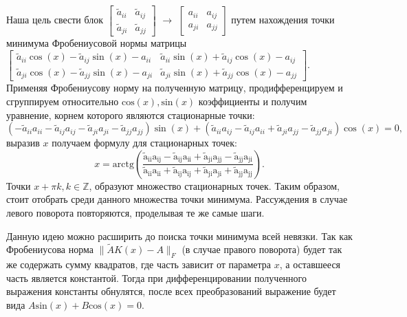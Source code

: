 Наша цель свести блок $\begin{bmatrix}
    \tilde{a}_{ii}&\tilde{a}_{ij}\\
    \tilde{a}_{ji}&\tilde{a}_{jj}
\end{bmatrix}$ $\to $
$\begin{bmatrix}
    a_{ii}&a_{ij}\\
    a_{ji}&a_{jj}
\end{bmatrix}$ путем нахождения точки минимума Фробениусовой нормы матрицы $\left[\begin{matrix}\tilde{a}_{ii} \cos{\left(x \right)} - \tilde{a}_{ij} \sin{\left(x \right)} - a_{ii} & \tilde{a}_{ii} \sin{\left(x \right)} + \tilde{a}_{ij} \cos{\left(x \right)} - a_{ij}\\ \tilde{a}_{ji} \cos{\left(x \right)} - \tilde{a}_{jj} \sin{\left(x \right)} - a_{ji} & \tilde{a}_{ji} \sin{\left(x \right)} + \tilde{a}_{jj} \cos{\left(x \right)} - a_{jj}\end{matrix}\right]$. Применяя Фробениусову норму на полученную матрицу, продифференцируем и сгруппируем относительно $\mathrm{cos}(x), \mathrm{sin}(x)$ коэффициенты и получим уравнение, корнем которого являются стационарные точки:
\begin{equation}
    \left(- \tilde{a}_{ii} a_{ii} - \tilde{a}_{ij} a_{ij} - \tilde{a}_{ji} a_{ji} - \tilde{a}_{jj} a_{jj}\right) \sin{\left(x \right)} + \left(\tilde{a}_{ii} a_{ij} - \tilde{a}_{ij} a_{ii} + \tilde{a}_{ji} a_{jj} - \tilde{a}_{jj} a_{ji}\right) \cos{\left(x \right)} = 0,
\end{equation}
выразив $x$ получаем формулу для стационарных точек:
\begin{equation}
    x = \mathrm{arctg(\frac{\tilde{a}_{ii} a_{ij} - \tilde{a}_{ij} a_{ii} + \tilde{a}_{ji} a_{jj} - \tilde{a}_{jj} a_{ji}}{\tilde{a}_{ii} a_{ii} + \tilde{a}_{ij} a_{ij} + \tilde{a}_{ji} a_{ji} + \tilde{a}_{jj} a_{jj}})}.
\end{equation}
Точки $x +\pi k, k\in \mathbb{Z}$, образуют множество стационарных точек. Таким образом, стоит отобрать среди данного множества точки минимума. 
Рассуждения в случае левого поворота повторяются, проделывая те же самые шаги.

\begin{note}
    Данную идею можно расширить до поиска точки минимума всей невязки. Так как Фробениусова норма $\|\tilde{A}K(x) - A\|_F$ (в случае правого поворота) будет так же содержать сумму квадратов, где часть зависит от параметра $x$, а оставшееся часть является константой. Тогда при дифференцировании полученного выражения константы обнулятся, после всех преобразований выражение будет вида $A\mathrm{sin}(x)+B\mathrm{cos}(x) = 0$.
\end{note}

